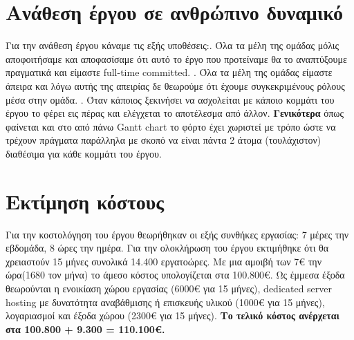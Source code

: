 
\section{Aνάθεση έργου σε ανθρώπινο δυναμικό}
\begin{flushleft}
\setlength{\parskip}{1em}
Για την ανάθεση έργου κάναμε τις εξής υποθέσεις:. Όλα τα μέλη της ομάδας μόλις αποφοιτήσαμε και αποφασίσαμε ότι αυτό το έργο που προτείναμε θα το αναπτύξουμε πραγματικά και είμαστε full-time committed. . Όλα τα μέλη της ομάδας είμαστε άπειρα και λόγω αυτής της απειρίας δε θεωρούμε ότι έχουμε συγκεκριμένους ρόλους μέσα στην ομάδα. . Όταν κάποιος ξεκινήσει να ασχολείται με κάποιο κομμάτι του έργου το φέρει εις πέρας και ελέγχεται το αποτέλεσμα από άλλον. \newline
\textbf{Γενικότερα} όπως φαίνεται και στο από πάνω Gantt chart το φόρτο έχει χωριστεί με τρόπο ώστε να τρέχουν πράγματα παράλληλα με σκοπό να είναι πάντα 2 άτομα (τουλάχιστον) διαθέσιμα για κάθε κομμάτι του έργου.
\end{flushleft}

\vspace{20 mm}

\section{Eκτίμηση κόστους} 
\begin{flushleft} 
Για την κοστολόγηση του έργου θεωρήθηκαν οι εξής συνθήκες εργασίας: 7 μέρες την εβδομάδα, 8 ώρες την ημέρα. Για την ολοκλήρωση του έργου εκτιμήθηκε ότι θα χρειαστούν 15 μήνες συνολικά 14.400 εργατοώρες. Με μια αμοιβή των 7€ την ώρα(1680 τον μήνα) το άμεσο κόστος υπολογίζεται στα 100.800€. Ως έμμεσα έξοδα θεωρούνται η ενοικίαση χώρου εργασίας (6000€ για 15 μήνες), dedicated server hosting με δυνατότητα αναβάθμισης ή επισκευής υλικού  (1000€ για 15 μήνες), λογαριασμοί και έξοδα χώρου (2300€ για 15 μήνες). \newline
\textbf{Το τελικό κόστος ανέρχεται στα 100.800 + 9.300 = 110.100€.}
\end{flushleft}